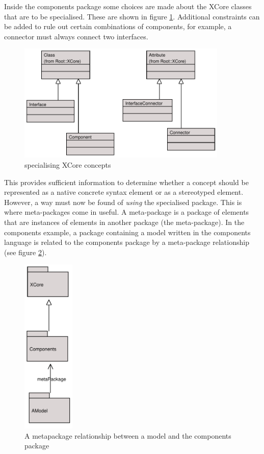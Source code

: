 Inside the components package some choices are made about the
XCore classes that are to be specialised. These are shown in
figure \ref{componentspecialisation2}. Additional constraints can
be added to rule out certain combinations of components, for
example, a connector must always connect two interfaces.

\begin{figure}[htb]
\begin{center}
\includegraphics[width=10cm]{LanguageFamilies/figures/componentspecialisation2}
\caption{specialising XCore concepts}
\label{componentspecialisation2}
\end{center}
\end{figure}

This provides sufficient information to determine whether a
concept should be represented as a native concrete syntax element
or as a stereotyped element. However, a way must now be found of
{\em using} the specialised package. This is where meta-packages
come in useful. A meta-package is a package of elements that are
instances of elements in another package (the meta-package). In
the components example, a package containing a model written in
the components language is related to the components package by a
meta-package relationship (see figure \ref{metapackage}).

\begin{figure}[htb]
\begin{center}
\includegraphics[width=2.5cm]{LanguageFamilies/figures/Metapackage}
\caption{A metapackage relationship between a model and the
components package} \label{metapackage}
\end{center}
\end{figure}

